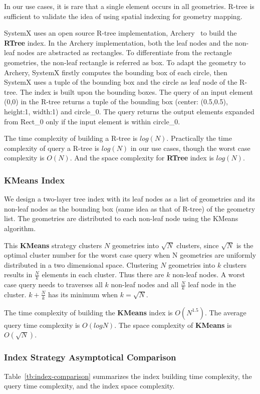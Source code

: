 \documentclass{sig-alternate}
\begin{document}
In our use cases, it is rare that a single element occurs in all geometries.  
R-tree is sufficient to validate the idea of using spatial indexing for geometry mapping.

SystemX uses an open source R-tree implementation, Archery~\cite{osheim13} to build the {\bf RTree} index.
In the Archery implementation, both the leaf nodes and the non-leaf nodes are abstracted as rectangles.
To differentiate from the rectangle geometries, the non-leaf rectangle is referred as box.
To adapt the geometry to Archery, SystemX firstly computes the bounding box of each circle, then SystemX uses
a tuple of the bounding box and the circle as leaf node of the R-tree. 
The index is built upon the bounding boxes. 
The query of an input element (0,0) in the R-tree returns a tuple of the bounding box (center: (0.5,0.5), height:1, width:1) and circle\_0.
The query returns the output elements expanded from Rect\_0 only if the input element is within circle\_0.

The time complexity of building a R-tree is $log(N)$.
Practically the time complexity of query a R-tree is $log(N)$ in our use cases, though
the worst case complexity is $O(N)$.
And the space complexity for {\bf RTree} index is $log(N)$.

\subsubsection{KMeans Index}
We design a two-layer tree index with its leaf nodes as a list of geometries and its non-leaf nodes as the bounding box (same idea as that of R-tree)
of the geometry list.
The geometries are distributed to each non-leaf node using the KMeans~\cite{macqueen67} algorithm.

This {\bf KMeans} strategy clusters $N$ geometries into $\sqrt{N}$ clusters, 
since $\sqrt{N}$ is the optimal cluster number for the worst case query when N geometries are uniformly distributed in a two dimensional space.
Clustering $N$ geometries into $k$ clusters results in $\frac{N}{k}$ elements in each cluster. 
Thus there are $k$ non-leaf nodes.
A worst case query needs to traverses all $k$ non-leaf nodes and all $\frac{N}{k}$ leaf node in the cluster.
$k+\frac{N}{k}$ has its minimum when $k=\sqrt{N}$. 

The time complexity of building the {\bf KMeans} index is $O(N^{1.5})$.
The average query time complexity is $O(logN)$.
The space complexity of {\bf KMeans} is $O(\sqrt{N})$.

\subsubsection{Index Strategy Asymptotical Comparison}
Table~\ref{tb:index-comparison} summarizes the index building time complexity, 
the query time complexity, and the index space complexity.
\end{document}
